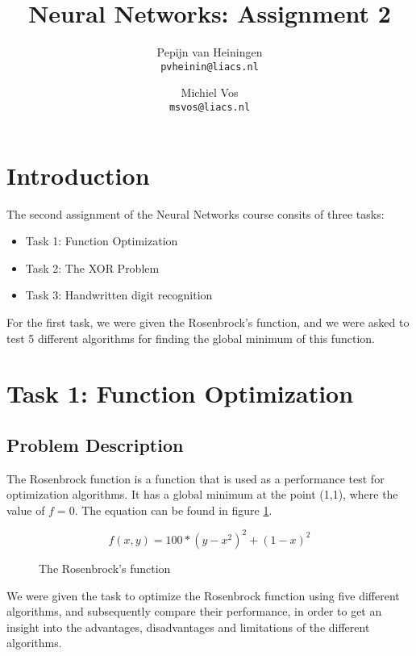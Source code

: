 \documentclass{article}
\title{Neural Networks: Assignment 2}
\author{Pepijn van Heiningen \\ \texttt{pvheinin@liacs.nl} \and Michiel Vos \\ \texttt{msvos@liacs.nl}}
\begin{document}
\maketitle

\section{Introduction}
The second assignment of the Neural Networks course consits of three tasks:\\
\begin{itemize}
\item Task 1: Function Optimization
\item Task 2: The XOR Problem
\item Task 3: Handwritten digit recognition
\end{itemize}

For the first task, we were given the Rosenbrock's function, and we were asked to test 5 different algorithms for finding the global minimum of this function. 



\newpage
\section{Task 1: Function Optimization}
\subsection{Problem Description}
The Rosenbrock function is a function that is used as a performance test for optimization algorithms. It has a global minimum at the point (1,1), where the value of $f = 0$. The equation can be found in figure \ref{eq:rosen}. \\

\begin{figure}[H]
\[f(x,y) = 100 * (y-x^2)^2 + (1 - x)^2\]
\caption{The Rosenbrock's function}
\label{eq:rosen}
\end{figure}



We were given the task to optimize the Rosenbrock function using five different algorithms, and subsequently compare their performance, in order to get an insight into the advantages, disadvantages and limitations of the different algorithms.\\

\end{document}
